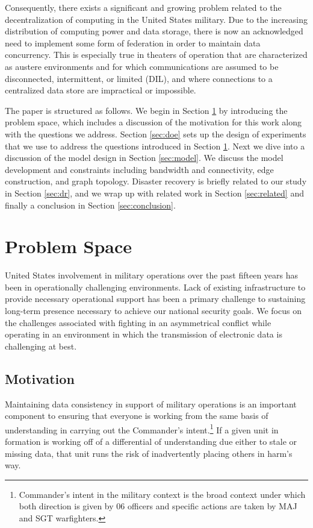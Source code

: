 \documentclass[10pt]{./IEEEtran}
\begin{document}
Consequently, there exists a significant and growing problem related to the decentralization of computing in the United States military.  Due to the increasing distribution of computing power and data storage, there is now an acknowledged need to implement some form of federation\cite{Takai:2012} in order to maintain data concurrency.  This is especially true in theaters of operation that are characterized as austere environments and for which communications are assumed to be disconnected, intermittent, or limited (DIL), and where connections to a centralized data store are impractical or impossible\cite{Sonnenberg:2009}.

The paper is structured as follows.  We begin in Section \ref{sec:probspace} by introducing the problem space, which includes a discussion of the motivation for this work along with the questions we address.  Section \ref{sec:doe} sets up the design of experiments that we use to address the questions introduced in Section \ref{sec:probspace}.  Next we dive into a discussion of the model design in Section \ref{sec:model}.  We discuss the model development and constraints including bandwidth and connectivity, edge construction, and graph topology.  Disaster recovery is briefly related to our study in Section \ref{sec:dr}, and we wrap up with related work in Section \ref{sec:related} and finally a conclusion in Section \ref{sec:conclusion}.


\section{Problem Space}
\label{sec:probspace}
United States involvement in military operations over the past fifteen years has been in operationally challenging environments.  Lack of existing infrastructure to provide necessary operational support has been a primary challenge to sustaining long-term presence necessary to achieve our national security goals.  We focus on the challenges associated with fighting in an asymmetrical conflict while operating in an environment in which the transmission of electronic data is challenging at best.

\subsection{Motivation}
Maintaining data consistency in support of military operations is an important component to ensuring that everyone is working from the same basis of understanding in carrying out the Commander's intent.\footnote{Commander's intent in the military context is the broad context under which both direction is given by 06 officers and specific actions are taken by MAJ and SGT warfighters.}  If a given unit in formation is working off of a differential of understanding due either to stale or missing data, that unit runs the risk of inadvertently placing others in harm's way.
\end{document}
